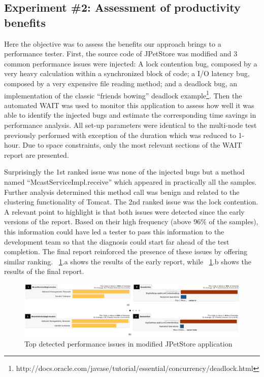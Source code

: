 \documentclass[runningheads,a4paper]{llncs}
\begin{document}
\vspace{-5pt}
\subsection{Experiment \#2: Assessment of productivity benefits}
\vspace{-2pt}

Here the objective was to assess the benefits our approach brings to a
performance tester. First, the source code of JPetStore was modified and 3
common performance issues were injected: A lock contention bug, composed by a
very heavy calculation within a synchronized block of code; a I/O latency bug, 
composed by a very expensive file reading method; and a deadlock bug, an
implementation of the classic ``friends bowing'' deadlock example\footnote{http://docs.oracle.com/javase/tutorial/essential/concurrency/deadlock.html}.
Then the automated WAIT was used to monitor this application to assess how well
it was able to identify the injected bugs and estimate the corresponding time
savings in performance analysis. All set-up parameters were identical to
the multi-node test previously performed with exception of the duration which
was reduced to 1-hour. Due to space constraints, only the most relevant sections
of the WAIT report are presented.

Surprisingly the 1st ranked issue was none of the injected bugs but a method
named ``McastServiceImpl.receive'' which appeared in practically all the
samples. Further analysis determined this method call was benign and related
to the clustering functionality of Tomcat. The 2nd ranked issue was the lock
contention. A relevant point to highlight is that both issues were detected
since the early versions of the report. Based on their high frequency (above
96\% of the samples), this information could have led a tester to pass this
information to the development team so that the diagnosis could start far ahead
of the test completion. The final report reinforced the presence of these issues 
by offering similar ranking. \figurename ~\ref{fig_run1_bugs12}.a shows the
results of the early report, while ~\ref{fig_run1_bugs12}.b shows the results of the final report.

\begin{figure}[!h]
\centering
\includegraphics[totalheight=.22\textheight,width=1\textwidth]{run1_issues12_short_long_run}
\caption{Top detected performance issues in modified JPetStore application}
\label{fig_run1_bugs12}
\end{figure}
\end{document}

